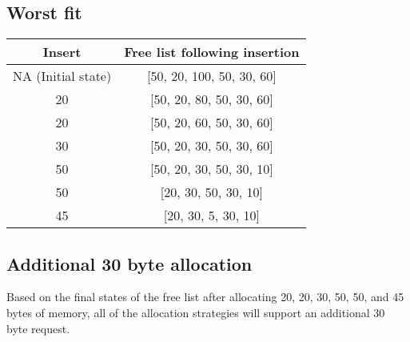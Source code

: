 \documentclass[paper=a4, fontsize=11pt]{scrartcl} %
\numberwithin{equation}{section} %
\numberwithin{figure}{section} %
\numberwithin{table}{section} %
\begin{document}
\subsection{Worst fit}

\begin{center}
\begin{tabular} {| c | c |}
\hline
\textbf{Insert} & \textbf{Free list following insertion} \\
\hline
NA (Initial state) & [50, 20, 100, 50, 30, 60] \\
\hline
20 & [50, 20, 80, 50, 30, 60] \\
\hline
20 & [50, 20, 60, 50, 30, 60] \\
\hline
30 & [50, 20, 30, 50, 30, 60] \\
\hline
50 & [50, 20, 30, 50, 30, 10] \\
\hline
50 & [20, 30, 50, 30, 10] \\
\hline
45 & [20, 30, 5, 30, 10] \\
\hline
\end{tabular}
\end{center}

\subsection{Additional 30 byte allocation}

Based on the final states of the free list after allocating 20, 20, 30, 50, 50, and 45 bytes of memory, all of the allocation strategies will support an additional 30 byte request.

\end{document}
